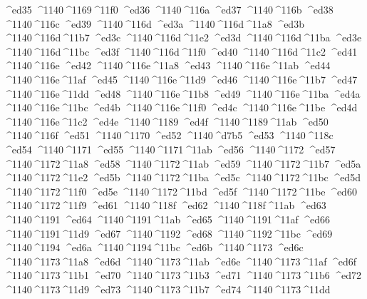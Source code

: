 \checkit ^^^^ed35 ^^^^1140^^^^1169^^^^11f0
\checkit ^^^^ed36 ^^^^1140^^^^116a
\checkit ^^^^ed37 ^^^^1140^^^^116b
\checkit ^^^^ed38 ^^^^1140^^^^116c
\checkit ^^^^ed39 ^^^^1140^^^^116d
\checkit ^^^^ed3a ^^^^1140^^^^116d^^^^11a8
\checkit ^^^^ed3b ^^^^1140^^^^116d^^^^11b7
\checkit ^^^^ed3c ^^^^1140^^^^116d^^^^11e2
\checkit ^^^^ed3d ^^^^1140^^^^116d^^^^11ba
\checkit ^^^^ed3e ^^^^1140^^^^116d^^^^11bc
\checkit ^^^^ed3f ^^^^1140^^^^116d^^^^11f0
\checkit ^^^^ed40 ^^^^1140^^^^116d^^^^11c2
\checkit ^^^^ed41 ^^^^1140^^^^116e
\checkit ^^^^ed42 ^^^^1140^^^^116e^^^^11a8
\checkit ^^^^ed43 ^^^^1140^^^^116e^^^^11ab
\checkit ^^^^ed44 ^^^^1140^^^^116e^^^^11af
\checkit ^^^^ed45 ^^^^1140^^^^116e^^^^11d9
\checkit ^^^^ed46 ^^^^1140^^^^116e^^^^11b7
\checkit ^^^^ed47 ^^^^1140^^^^116e^^^^11dd
\checkit ^^^^ed48 ^^^^1140^^^^116e^^^^11b8
\checkit ^^^^ed49 ^^^^1140^^^^116e^^^^11ba
\checkit ^^^^ed4a ^^^^1140^^^^116e^^^^11bc
\checkit ^^^^ed4b ^^^^1140^^^^116e^^^^11f0
\checkit ^^^^ed4c ^^^^1140^^^^116e^^^^11be
\checkit ^^^^ed4d ^^^^1140^^^^116e^^^^11c2
\checkit ^^^^ed4e ^^^^1140^^^^1189
\checkit ^^^^ed4f ^^^^1140^^^^1189^^^^11ab
\checkit ^^^^ed50 ^^^^1140^^^^116f
\checkit ^^^^ed51 ^^^^1140^^^^1170
\checkit ^^^^ed52 ^^^^1140^^^^d7b5
\checkit ^^^^ed53 ^^^^1140^^^^118c
\checkit ^^^^ed54 ^^^^1140^^^^1171
\checkit ^^^^ed55 ^^^^1140^^^^1171^^^^11ab
\checkit ^^^^ed56 ^^^^1140^^^^1172
\checkit ^^^^ed57 ^^^^1140^^^^1172^^^^11a8
\checkit ^^^^ed58 ^^^^1140^^^^1172^^^^11ab
\checkit ^^^^ed59 ^^^^1140^^^^1172^^^^11b7
\checkit ^^^^ed5a ^^^^1140^^^^1172^^^^11e2
\checkit ^^^^ed5b ^^^^1140^^^^1172^^^^11ba
\checkit ^^^^ed5c ^^^^1140^^^^1172^^^^11bc
\checkit ^^^^ed5d ^^^^1140^^^^1172^^^^11f0
\checkit ^^^^ed5e ^^^^1140^^^^1172^^^^11bd
\checkit ^^^^ed5f ^^^^1140^^^^1172^^^^11be
\checkit ^^^^ed60 ^^^^1140^^^^1172^^^^11f9
\checkit ^^^^ed61 ^^^^1140^^^^118f
\checkit ^^^^ed62 ^^^^1140^^^^118f^^^^11ab
\checkit ^^^^ed63 ^^^^1140^^^^1191
\checkit ^^^^ed64 ^^^^1140^^^^1191^^^^11ab
\checkit ^^^^ed65 ^^^^1140^^^^1191^^^^11af
\checkit ^^^^ed66 ^^^^1140^^^^1191^^^^11d9
\checkit ^^^^ed67 ^^^^1140^^^^1192
\checkit ^^^^ed68 ^^^^1140^^^^1192^^^^11bc
\checkit ^^^^ed69 ^^^^1140^^^^1194
\checkit ^^^^ed6a ^^^^1140^^^^1194^^^^11bc
\checkit ^^^^ed6b ^^^^1140^^^^1173
\checkit ^^^^ed6c ^^^^1140^^^^1173^^^^11a8
\checkit ^^^^ed6d ^^^^1140^^^^1173^^^^11ab
\checkit ^^^^ed6e ^^^^1140^^^^1173^^^^11af
\checkit ^^^^ed6f ^^^^1140^^^^1173^^^^11b1
\checkit ^^^^ed70 ^^^^1140^^^^1173^^^^11b3
\checkit ^^^^ed71 ^^^^1140^^^^1173^^^^11b6
\checkit ^^^^ed72 ^^^^1140^^^^1173^^^^11d9
\checkit ^^^^ed73 ^^^^1140^^^^1173^^^^11b7
\checkit ^^^^ed74 ^^^^1140^^^^1173^^^^11dd

